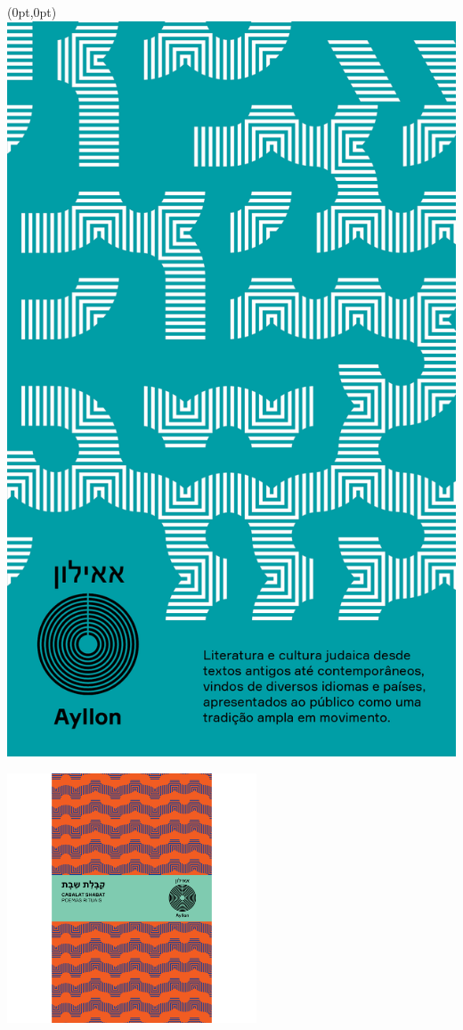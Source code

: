 \pagestyle{ayllon}
\label{ayllon}


\begin{textblock*}{5.625in}(0pt,0pt)%
\vspace*{-3.2cm}
\hspace*{-1.95cm}\includegraphics*[width=145mm]{./imgs/AYLLON.png}
\end{textblock*}

\pagebreak %

\begin{center}
\hspace*{.5cm}\includegraphics[width=74mm]{./grid/cabalat.png}
\end{center}

